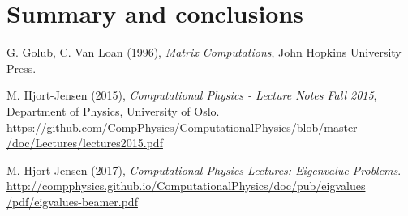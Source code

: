 \documentclass[12pt, a4paper]{article}
\begin{document}
\section{Summary and conclusions}

\begin{thebibliography}{40}

 G. Golub, C. Van Loan (1996), \textit{Matrix Computations}, John Hopkins University 
Press. 

 M. Hjort-Jensen (2015), \textit{Computational Physics - Lecture Notes Fall 2015}, 
Department of Physics, University of Oslo. \\ 
\href{https://github.com/CompPhysics/ComputationalPhysics/blob/master/doc/Lectures/lectures2015.pdf}
{https://github.com/CompPhysics/ComputationalPhysics/blob/master\\/doc/Lectures/lectures2015.pdf}

 M. Hjort-Jensen (2017), \textit{Computational Physics Lectures: 
Eigenvalue Problems}. 
\href{http://compphysics.github.io/ComputationalPhysics/doc/pub/eigvalues/pdf/eigvalues-beamer.pdf}
{http://compphysics.github.io/ComputationalPhysics/doc/pub/eigvalues\\/pdf/eigvalues-beamer.pdf}

\end{thebibliography}
\end{document}
